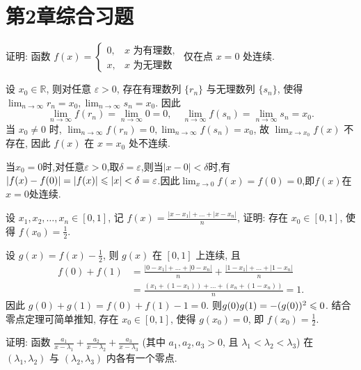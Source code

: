 \section{第2章综合习题}

\begin{exercise}[2.C.1]
    证明: 函数 $f(x) = \begin{cases} 0, & x \text{ 为有理数}, \\ x, & x \text{ 为无理数} \end{cases}$ 仅在点 $x=0$ 处连续.
\end{exercise}

\begin{solution}
    设 $x_0 \in \mathbb{R}$, 则对任意 $\varepsilon > 0$, 存在有理数列 $\{r_n\}$ 与无理数列 $\{s_n\}$, 使得 $\lim_{n \to \infty} r_n = x_0, \lim_{n \to \infty} s_n = x_0$. 因此
    $$ \lim_{n \to \infty} f(r_n) = \lim_{n \to \infty} 0 = 0, \quad \lim_{n \to \infty} f(s_n) = \lim_{n \to \infty} s_n = x_0. $$
    当 $x_0 \ne 0$ 时, $\lim_{n \to \infty} f(r_n) = 0, \lim_{n \to \infty} f(s_n) = x_0$, 故 $\lim_{x \to x_0} f(x)$ 不存在, 因此 $f(x)$ 在 $x=x_0$ 处不连续.

    当$x_0 = 0$时,对任意$\varepsilon > 0$,取$\delta = \varepsilon$,则当$|x-0| < \delta$时,有$|f(x)-f(0)| = |f(x)| \leqslant |x| < \delta = \varepsilon$.因此$\lim_{x \to 0} f(x) = f(0) = 0$,即$f(x)$在$x=0$处连续.
\end{solution}

\begin{exercise}[2.C.2]
    设 $x_1, x_2, \dots, x_n \in [0,1]$, 记 $f(x) = \frac{|x-x_1|+\dots+|x-x_n|}{n}$, 证明: 存在 $x_0 \in [0,1]$, 使得 $f(x_0) = \frac{1}{2}$.
\end{exercise}

\begin{solution}
    设 $g(x) = f(x) - \frac{1}{2}$, 则 $g(x)$ 在 $[0,1]$ 上连续, 且
    \begin{align*}
        f(0) + f(1) & = \frac{|0-x_1|+\dots+|0-x_n|}{n} + \frac{|1-x_1|+\dots+|1-x_n|}{n} \\
                    & = \frac{(x_1 + (1-x_1)) + \dots + (x_n + (1-x_n))}{n} = 1.
    \end{align*}
    因此 $g(0) + g(1) = f(0) + f(1) - 1 = 0$. 则$g(0) g(1) = -(g(0))^2 \leqslant 0$. 结合零点定理可简单推知, 存在 $x_0 \in [0,1]$, 使得 $g(x_0) = 0$, 即 $f(x_0) = \frac{1}{2}$.
\end{solution}

\begin{exercise}[2.C.3]
    证明: 函数 $\frac{a_1}{x-\lambda_1} + \frac{a_2}{x-\lambda_2} + \frac{a_3}{x-\lambda_3}$ (其中 $a_1, a_2, a_3 > 0$, 且 $\lambda_1 < \lambda_2 < \lambda_3$) 在 $(\lambda_1, \lambda_2)$ 与 $(\lambda_2, \lambda_3)$ 内各有一个零点.
\end{exercise}

